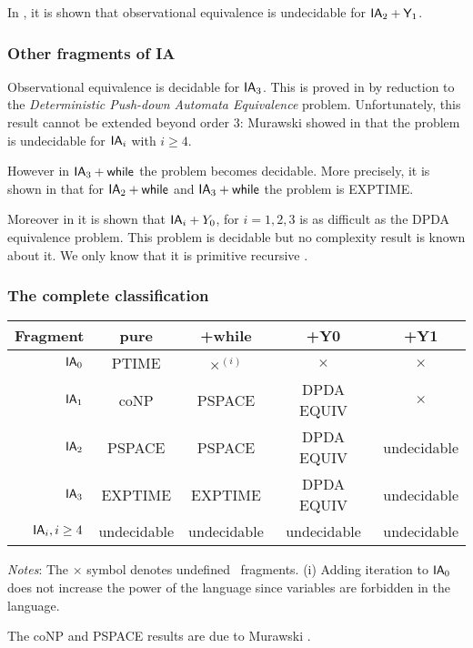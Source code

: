 In \cite{Ong02}, it is shown that observational equivalence is
undecidable for $\textsf{IA}_2 + \textsf{Y}_1$.


\subsubsection{Other fragments of IA}

Observational equivalence is decidable for $\textsf{IA}_3$. This is
proved in \cite{Ong02} by reduction to the \emph{Deterministic
Push-down Automata Equivalence} problem. Unfortunately, this result
cannot be extended beyond order $3$: Murawski showed in
\cite{murawski03program} that the problem is undecidable for
$\textsf{IA}_i$ with $i\geq4$.

However in $\textsf{IA}_3 + \textsf{while}$ the problem becomes
decidable. More precisely, it is shown in
\cite{DBLP:conf/fossacs/MurawskiW05} that for $\textsf{IA}_2 +
\textsf{while}$ and $\textsf{IA}_3 + \textsf{while}$ the problem is
EXPTIME.

Moreover in \cite{DBLP:conf/icalp/MurawskiOW05} it is shown that
$\textsf{IA}_i +Y_0$, for $i = 1, 2, 3$ is as difficult as the DPDA
equivalence problem. This problem is decidable
\citep{DBLP:journals/tcs/Senizergues01} but no complexity result is
known about it. We only know that it is primitive recursive
\citep{stirling02}.

\subsubsection{The complete classification}
\begin{center}
\begin{tabular}{rcccc}
Fragment  & pure & +while & +Y0 & +Y1 \\ \hline \hline
$\textsf{IA}_0$ & PTIME & $\times^{(i)}$ & $\times$ & $\times$  \\
$\textsf{IA}_1$ & coNP & PSPACE & DPDA EQUIV & $\times$ \\
$\textsf{IA}_2$ & PSPACE & PSPACE & DPDA EQUIV & undecidable \\
$\textsf{IA}_3$ &EXPTIME & EXPTIME & DPDA EQUIV & undecidable \\
$\textsf{IA}_i, i \geq 4$  & undecidable & undecidable & undecidable
& undecidable
\end{tabular}
\vspace{12pt}

\emph{Notes}: The $\times$ symbol denotes undefined \ialgol\ fragments.
(i) Adding iteration to $\textsf{IA}_0$ does not increase the power of the language since variables are forbidden in the language.
\end{center}

The coNP and PSPACE results are due to Murawski \citep{Mur04b}.

%
